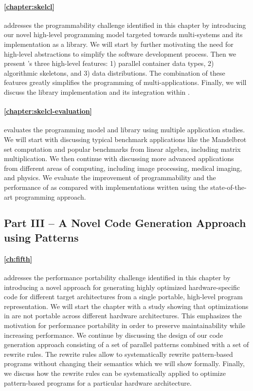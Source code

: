 \paragraph{\autoref{chapter:skelcl}} addresses the programmability challenge identified in this chapter by introducing our novel \SkelCL high-level programming model targeted towards multi-\GPU systems and its implementation as a \Cpp library.
We will start by further motivating the need for high-level abstractions to simplify the software development process.
Then we present \SkelCL's three high-level features:
1) parallel container data types, 2) algorithmic skeletons, and 3) data distributions.
The combination of these features greatly simplifies the programming of multi-\GPU applications.
Finally, we will discuss the \SkelCL library implementation and its integration within \Cpp.

\paragraph{\autoref{chapter:skelcl-evaluation}} evaluates the \SkelCL programming model and library using multiple application studies.
We will start with discussing typical benchmark applications like the Mandelbrot set computation and popular benchmarks from linear algebra, including matrix multiplication.
We then continue with discussing more advanced applications from different areas of computing, including image processing, medical imaging, and physics.
We evaluate the improvement of programmability and the performance of \SkelCL as compared with implementations written using the state-of-the-art \OpenCL programming approach.


\subsection*{Part III -- A Novel Code Generation Approach using Patterns}

\paragraph{\autoref{ch:fifth}} addresses the performance portability challenge identified in this chapter by introducing a novel approach for generating highly optimized hardware-specific code for different target architectures from a single portable, high-level program representation.
We will start the chapter with a study showing that optimizations in \OpenCL are not portable across different hardware architectures.
This emphasizes the motivation for performance portability in order to preserve maintainability while increasing performance.
We continue by discussing the design of our code generation approach consisting of a set of parallel patterns combined with a set of rewrite rules.
The rewrite rules allow to systematically rewrite pattern-based programs without changing their semantics which we will show formally.
Finally, we discuss how the rewrite rules can be systematically applied to optimize pattern-based programs for a particular hardware architecture.

